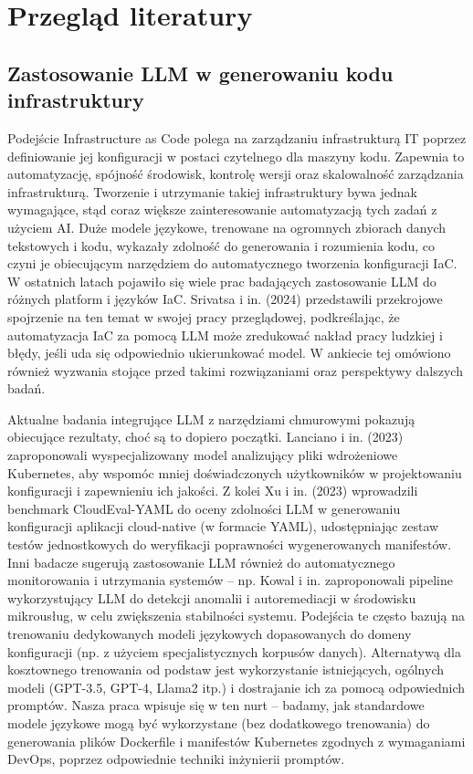 \clearpage %
\section{Przegląd literatury}

\subsection{Zastosowanie LLM w generowaniu kodu infrastruktury}

Podejście Infrastructure as Code polega na zarządzaniu infrastrukturą IT poprzez definiowanie jej konfiguracji w postaci czytelnego dla maszyny kodu. Zapewnia to automatyzację, spójność środowisk, kontrolę wersji oraz skalowalność zarządzania infrastrukturą. Tworzenie i utrzymanie takiej infrastruktury bywa jednak wymagające, stąd coraz większe zainteresowanie automatyzacją tych zadań z użyciem AI. Duże modele językowe, trenowane na ogromnych zbiorach danych tekstowych i kodu, wykazały zdolność do generowania i rozumienia kodu, co czyni je obiecującym narzędziem do automatycznego tworzenia konfiguracji IaC. W ostatnich latach pojawiło się wiele prac badających zastosowanie LLM do różnych platform i języków IaC. Srivatsa i in. (2024) przedstawili przekrojowe spojrzenie na ten temat w swojej pracy przeglądowej, podkreślając, że automatyzacja IaC za pomocą LLM może zredukować nakład pracy ludzkiej i błędy, jeśli uda się odpowiednio ukierunkować model. W ankiecie tej omówiono również wyzwania stojące przed takimi rozwiązaniami oraz perspektywy dalszych badań.

Aktualne badania integrujące LLM z narzędziami chmurowymi pokazują obiecujące rezultaty, choć są to dopiero początki. Lanciano i in. (2023) zaproponowali wyspecjalizowany model analizujący pliki wdrożeniowe Kubernetes, aby wspomóc mniej doświadczonych użytkowników w projektowaniu konfiguracji i zapewnieniu ich jakości. Z kolei Xu i in. (2023) wprowadzili benchmark CloudEval-YAML do oceny zdolności LLM w generowaniu konfiguracji aplikacji cloud-native (w formacie YAML), udostępniając zestaw testów jednostkowych do weryfikacji poprawności wygenerowanych manifestów. Inni badacze sugerują zastosowanie LLM również do automatycznego monitorowania i utrzymania systemów – np. Kowal i in. zaproponowali pipeline wykorzystujący LLM do detekcji anomalii i autoremediacji w środowisku mikrousług, w celu zwiększenia stabilności systemu. Podejścia te często bazują na trenowaniu dedykowanych modeli językowych dopasowanych do domeny konfiguracji (np. z użyciem specjalistycznych korpusów danych). Alternatywą dla kosztownego trenowania od podstaw jest wykorzystanie istniejących, ogólnych modeli (GPT-3.5, GPT-4, Llama2 itp.) i dostrajanie ich za pomocą odpowiednich promptów. Nasza praca wpisuje się w ten nurt – badamy, jak standardowe modele językowe mogą być wykorzystane (bez dodatkowego trenowania) do generowania plików Dockerfile i manifestów Kubernetes zgodnych z wymaganiami DevOps, poprzez odpowiednie techniki inżynierii promptów.

